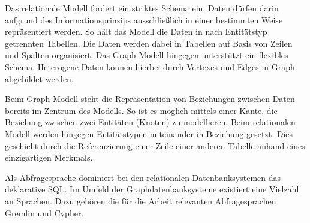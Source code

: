 Das relationale Modell fordert ein striktes Schema ein. Daten dürfen darin aufgrund des Informationsprinzips ausschließlich in einer bestimmten Weise repräsentiert werden. So hält das Modell die Daten in nach Entitätstyp getrennten Tabellen. Die Daten werden dabei in Tabellen auf Basis von Zeilen und Spalten organisiert. Das Graph-Modell hingegen unterstützt ein flexibles Schema. Heterogene Daten können hierbei durch Vertexes und Edges in Graph abgebildet werden. 

Beim Graph-Modell steht die Repräsentation von Beziehungen zwischen Daten bereits im Zentrum des Modells. So ist es möglich mittels einer Kante, die Beziehung zwischen zwei Entitäten (Knoten) zu modellieren. Beim relationalen Modell werden hingegen Entitätstypen miteinander in Beziehung gesetzt. Dies geschieht durch die Referenzierung einer Zeile einer anderen Tabelle anhand eines einzigartigen Merkmals.

Als Abfragesprache dominiert bei den relationalen Datenbanksystemen das deklarative SQL. Im Umfeld der Graphdatenbanksysteme existiert eine Vielzahl an Sprachen. Dazu gehören die für die Arbeit relevanten Abfragesprachen Gremlin und Cypher. 